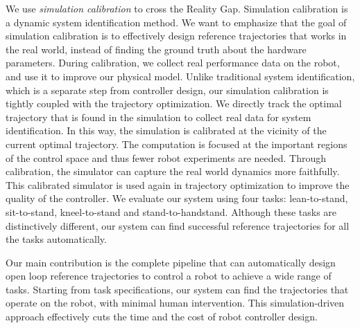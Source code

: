 We use \emph{simulation calibration} to cross the Reality Gap. Simulation calibration is a dynamic system identification method. We want to emphasize that the goal of simulation calibration is to effectively design reference trajectories that works in the real world, instead of finding the ground truth about the hardware parameters. During calibration, we collect real performance data on the robot, and use it to improve our physical model. Unlike traditional system identification, which is a separate step from controller design, our simulation calibration is tightly coupled with the trajectory optimization. We directly track the optimal trajectory that is found in the simulation to collect real data for system identification. In this way, the simulation is calibrated at the vicinity of the current optimal trajectory. The computation is focused at the important regions of the control space and thus fewer robot experiments are needed. Through calibration, the simulator can capture the real world dynamics more faithfully. This calibrated simulator is used again in trajectory optimization to improve the quality of the controller. We evaluate our system using four tasks: lean-to-stand, sit-to-stand, kneel-to-stand and stand-to-handstand. Although these tasks are distinctively different, our system can find successful reference trajectories for all the tasks automatically.

Our main contribution is the complete pipeline that can automatically design open loop reference trajectories to control a robot to achieve a wide range of tasks. Starting from task specifications, our system can find the trajectories that operate on the robot, with minimal human intervention. This simulation-driven approach effectively cuts the time and the cost of robot controller design. 
